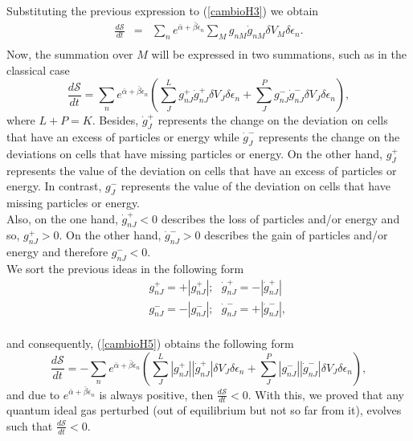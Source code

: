 \documentclass{article}
\newcommand{\de}{\delta}
\newcommand{\Ss}{\mathcal{S}}
\begin{document}
Substituting the previous expression to (\ref{cambioH3}) we obtain
\begin{eqnarray}
   \frac{d\Ss}{dt}&=&  \sum_n e^{\bar{\alpha}+\bar{\beta}\epsilon_n}\sum_M  g_{nM}\dot{g}_{nM} \de V_M\delta \epsilon_n. \nonumber \\ \label{cambioH4}
\end{eqnarray}{}
Now, the summation over $M$ will be expressed in two summations, such as in the classical case
\begin{equation}
    \frac{d\Ss}{dt}=\sum_n  e^{\bar{\alpha}+\bar{\beta}\epsilon_n}\left(\sum_J ^{L} g^{+}_{nJ}\dot{g}^{+}_{nJ}\de V_J \delta \epsilon_n+\sum^{P}_J  g^{-}_{nJ}\dot{g}^{-}_{nJ} \de V_J\delta \epsilon_n \right), \label{cambioH5}
\end{equation}
where $L+P=K$. Besides, $\dot{g}^{+}_{J}$ represents the change on the deviation on cells that have an excess of particles or energy while $\dot{g}^{-}_{J}$  represents the change on the deviations on cells that have missing particles or energy. 
On the other hand, $g^{+}_{J}$  represents the value of the deviation on cells that have an excess of particles or energy. In contrast, $g^{-}_{J}$ represents the value of the deviation on cells that have missing particles or energy.\\
Also, on the one hand, $\dot{g}^{+}_{nJ}<0$ describes the loss of particles and/or energy and so, $g^{+}_{nJ}>0$. On the other hand, $\dot{g}^{-}_{nJ}>0$ describes the gain of particles and/or energy and therefore $g^{-}_{nJ}<0$. \\
We sort the previous ideas in the following form
\begin{eqnarray}
   &&g^{+}_{nJ}=+|g^{+}_{nJ}|; \ \ \  \dot{g}^{+}_{nJ}=-|\dot{g}^{+}_{nJ}| \nonumber \\
   &&g^{-}_{nJ}=-|g^{-}_{nJ}|; \ \ \ \dot{g}^{-}_{nJ}=+|\dot{g}^{-}_{nJ}| \label{separacion},
\end{eqnarray}{}
\\
and consequently, (\ref{cambioH5}) obtains the following form
\begin{equation}
    \frac{d\Ss}{dt}=-\sum_n  e^{\bar{\alpha}+\bar{\beta}\epsilon_n}\left(\sum_J ^{L} |g^{+}_{nJ}||\dot{g}^{+}_{nJ}|\de V_J \delta \epsilon_n+\sum^{P}_J  |g^{-}_{nJ}||\dot{g}^{-}_{nJ}| \de V_J \delta \epsilon_n \right), \label{cambioH6}
\end{equation}{}
and due to $e^{\bar{\alpha}+\bar{\beta}\epsilon_n}$ is always positive, then $\frac{d\Ss}{dt}<0$. With this, we proved that any quantum ideal gas perturbed (out of equilibrium but not so far from it), evolves such that $\frac{d\Ss}{dt}<0$.\\
\end{document}
